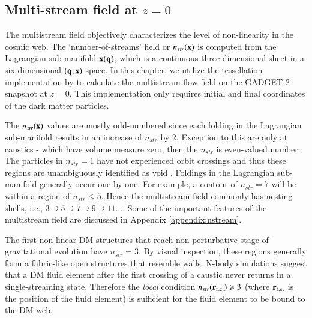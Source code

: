 \subsection{Multi-stream field at $z=0$}
\label{sec:multiCalc}


The multistream field objectively characterizes the level of non-linearity in the cosmic web. The `number-of-streams' field or $n_{str}({\bf x})$ is computed from the Lagrangian sub-manifold ${\bf x}({\bf q})$, which is a continuous three-dimensional sheet in a six-dimensional  $({\bf q}, {\bf x})$ space. In this chapter, we utilize the tessellation implementation by \cite{Shandarin2012} to calculate the multistream flow field on the GADGET-2 snapshot at $z=0$. This implementation only requires initial and final coordinates of the dark matter particles. 

The $n_{str}(\bf{x})$ values are mostly odd-numbered since each folding in the Lagrangian sub-manifold results in an increase of $n_{str}$ by 2. Exception to this are only at caustics - which have volume measure zero, then the $n_{str}$ is even-valued number. The particles in $n_{str} = 1$ have not experienced orbit crossings and thus these regions are unambiguously identified as void \citep{Shandarin2012}. Foldings in the Lagrangian sub-manifold generally occur one-by-one. For example, a contour of $n_{str} = 7$ will be within a region of $n_{str} \leq 5$. Hence the multistream field commonly has nesting shells, i.e., $ 3 \supseteq  5 \supseteq  7 \supseteq  9 \supseteq  11 \ldots$. Some of the important features of the multistream field are discussed in Appendix \ref{appendix:nstream}.  

The first non-linear DM structures that reach non-perturbative stage of gravitational evolution have $n_{str} = 3$. By visual inspection, these regions generally form a fabric-like open structures that resemble walls. N-body simulations suggest that a DM fluid element after the first 
crossing of a caustic never returns in  a single-streaming state. Therefore the {\it local} condition $n_{str}({\bf r}_{\rm f.e.}) \geq 3$
(where  ${\bf r}_{\rm f.e.}$ is the position of the fluid element) is  sufficient for the fluid element to be bound to the DM web.


